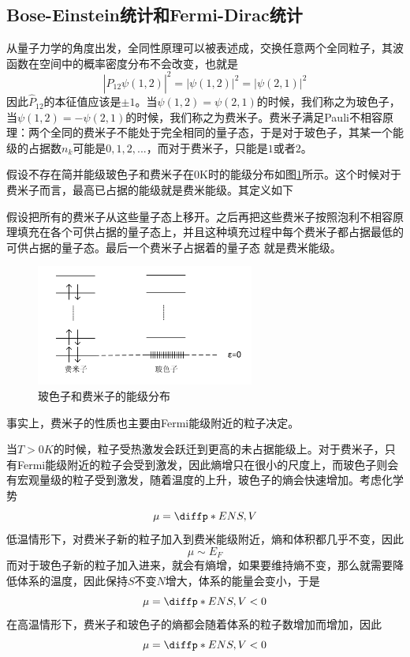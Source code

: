 \subsection{Bose-Einstein统计和Fermi-Dirac统计} %
\label{sub:Bose-Einstein统计和Fermi-Dirac统计}
从量子力学的角度出发，全同性原理可以被表述成，交换任意两个全同粒子，其波函数在空间中的概率密度分布不会改变，也就是\begin{equation}
    |\hat{P}_{12}\psi(1,2)|^2=|\psi(1,2)|^2=|\psi(2,1)|^2
\end{equation}
因此$\hat{P}_{12}$的本征值应该是$\pm 1$。当$\psi(1,2)=\psi(2,1)$的时候，我们称之为玻色子，当$\psi(1,2)=-\psi(2,1)$的时候，我们称之为费米子。费米子满足Pauli不相容原理：两个全同的费米子不能处于完全相同的量子态，于是对于玻色子，其某一个能级的占据数$n_k$可能是$0,1,2,...$，而对于费米子，只能是$1$或者$2$。

假设不存在简并能级玻色子和费米子在0K时的能级分布如图\ref{fig:boson and fermion}所示。这个时候对于费米子而言，最高已占据的能级就是费米能级。其定义如下\begin{definition}
    假设把所有的费米子从这些量子态上移开。之后再把这些费米子按照泡利不相容原理填充在各个可供占据的量子态上，并且这种填充过程中每个费米子都占据最低的可供占据的量子态。最后一个费米子占据着的量子态 就是费米能级。
\end{definition}
\begin{figure}[h]
    \centering
    \includegraphics[width=0.64\textwidth]{fig/boson and fermion.png}
    \caption{玻色子和费米子的能级分布}
    \label{fig:boson and fermion}
\end{figure}
事实上，费米子的性质也主要由Fermi能级附近的粒子决定。

当$T>0K$的时候，粒子受热激发会跃迁到更高的未占据能级上。对于费米子，只有Fermi能级附近的粒子会受到激发，因此熵增只在很小的尺度上，而玻色子则会有宏观量级的粒子受到激发，随着温度的上升，玻色子的熵会快速增加。考虑化学势\begin{equation}
    \mu =\diffp*{E}{N}{S,V}
\end{equation}
低温情形下，对费米子新的粒子加入到费米能级附近，熵和体积都几乎不变，因此\begin{equation}
    \mu \sim E_F
\end{equation}
而对于玻色子新的粒子加入进来，就会有熵增，如果要维持熵不变，那么就需要降低体系的温度，因此保持$S$不变$N$增大，体系的能量会变小，于是\begin{equation}
    \mu = \diffp*{E}{N}{S,V}< 0
\end{equation}
在高温情形下，费米子和玻色子的熵都会随着体系的粒子数增加而增加，因此\begin{equation}
    \mu = \diffp*{E}{N}{S,V}< 0
\end{equation}

